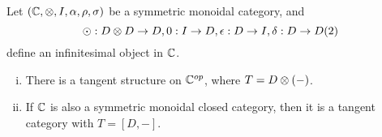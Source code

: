 \begin{proposition}%
    \label{prop:inf-object-tangent-structures}
    Let $(\mathbb{C}, \otimes, I, \alpha, \rho, \sigma)$ be a symmetric monoidal category, and \[\odot:D \otimes D \to D, 0:I \to D, \epsilon: D \to I, \delta: D \to D(2)\] define an infinitesimal object in $\mathbb{C}$.
    \begin{enumerate}[(i)]
        \item There is a tangent structure on $\mathbb{C}^{op}$, where $T = D \otimes (-)$.
        \item If $\mathbb{C}$ is also a symmetric monoidal closed category, then it is a tangent category with $T = [D, -]$.
    \end{enumerate}
\end{proposition}
